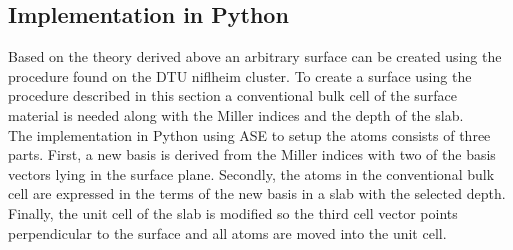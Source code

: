 \documentclass[11pt]{article} %
\begin{document}
\subsection{Implementation in Python}\label{implementation}
Based on the theory derived above an arbitrary surface can be created using the procedure found on the DTU niflheim cluster. To create a surface using the procedure described in this section a conventional bulk cell of the surface material is needed along with the Miller indices and the depth of the slab. \\
The implementation in Python using ASE to setup the atoms consists of three parts. First, a new basis is derived from the Miller indices with two of the basis vectors lying in the surface plane. Secondly, the atoms in the conventional bulk cell are expressed in the terms of the new basis in a slab with the selected depth. Finally, the unit cell of the slab is modified so the third cell vector points perpendicular to the surface and all atoms are moved into the unit cell.
\end{document}
